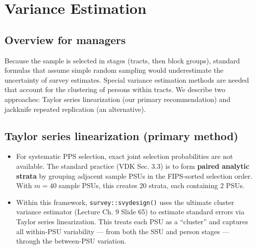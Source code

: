 \documentclass[
  11pt,
]{article}
\newenvironment{Shaded}{\begin{snugshade}}{\end{snugshade}}
\newcommand{\AttributeTok}[1]{\textcolor[rgb]{0.40,0.45,0.13}{#1}}
\newcommand{\CommentTok}[1]{\textcolor[rgb]{0.37,0.37,0.37}{#1}}
\newcommand{\DecValTok}[1]{\textcolor[rgb]{0.68,0.00,0.00}{#1}}
\newcommand{\FunctionTok}[1]{\textcolor[rgb]{0.28,0.35,0.67}{#1}}
\newcommand{\NormalTok}[1]{\textcolor[rgb]{0.00,0.23,0.31}{#1}}
\newcommand{\OtherTok}[1]{\textcolor[rgb]{0.00,0.23,0.31}{#1}}
\newcommand{\SpecialCharTok}[1]{\textcolor[rgb]{0.37,0.37,0.37}{#1}}
\newcommand{\StringTok}[1]{\textcolor[rgb]{0.13,0.47,0.30}{#1}}
\begin{document}
\section{Variance Estimation}\label{sec-variance}

\subsection{Overview for managers}\label{overview-for-managers-1}

Because the sample is selected in stages (tracts, then block groups),
standard formulas that assume simple random sampling would underestimate
the uncertainty of survey estimates. Special variance estimation methods
are needed that account for the clustering of persons within tracts. We
describe two approaches: Taylor series linearization (our primary
recommendation) and jackknife repeated replication (an alternative).

\subsection{Taylor series linearization (primary
method)}\label{taylor-series-linearization-primary-method}

\begin{itemize}
\item
  For systematic PPS selection, exact joint selection probabilities are
  not available. The standard practice (VDK Sec. 3.3) is to form
  \textbf{paired analytic strata} by grouping adjacent sample PSUs in
  the FIPS-sorted selection order. With \(m = 40\) sample PSUs, this
  creates 20 strata, each containing 2 PSUs.
\item
  Within this framework, \texttt{survey::svydesign()} uses the ultimate
  cluster variance estimator (Lecture Ch. 9 Slide 65) to estimate
  standard errors via Taylor series linearization. This treats each PSU
  as a ``cluster'' and captures all within-PSU variability --- from both
  the SSU and person stages --- through the between-PSU variation.
\end{itemize}

\begin{Shaded}
\end{Shaded}
\end{document}
